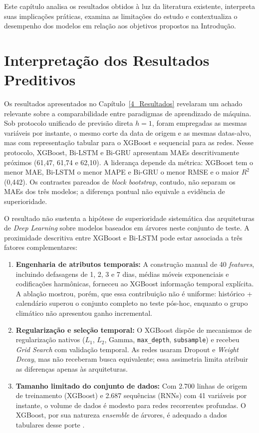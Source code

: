 Este capítulo analisa os resultados obtidos à luz da literatura existente, interpreta suas implicações práticas, examina as limitações do estudo e contextualiza o desempenho dos modelos em relação aos objetivos propostos na Introdução.

\section{Interpretação dos Resultados Preditivos}

Os resultados apresentados no Capítulo~\ref{4_Resultados} revelaram um achado relevante sobre a comparabilidade entre paradigmas de aprendizado de máquina. Sob protocolo unificado de previsão direta $h=1$, foram empregadas as mesmas variáveis por instante, o mesmo corte da data de origem e as mesmas datas-alvo, mas com representação tabular para o XGBoost e sequencial para as redes. Nesse protocolo, XGBoost, Bi-LSTM e Bi-GRU apresentam MAEs descritivamente próximos (61,47, 61,74 e 62,10). A liderança depende da métrica: XGBoost tem o menor MAE, Bi-LSTM o menor MAPE e Bi-GRU o menor RMSE e o maior $R^2$ (0,442). Os contrastes pareados de \textit{block bootstrap}, contudo, não separam os MAEs dos três modelos; a diferença pontual não equivale a evidência de superioridade.

O resultado não sustenta a hipótese de superioridade sistemática das arquiteturas de \textit{Deep Learning} sobre modelos baseados em árvores neste conjunto de teste. A proximidade descritiva entre XGBoost e Bi-LSTM pode estar associada a três fatores complementares:

\begin{enumerate}
    \item \textbf{Engenharia de atributos temporais:} A construção manual de 40 \textit{features}, incluindo defasagens de 1, 2, 3 e 7 dias, médias móveis exponenciais e codificações harmônicas, forneceu ao XGBoost informação temporal explícita. A ablação mostrou, porém, que essa contribuição não é uniforme: histórico + calendário superou o conjunto completo no teste pós-hoc, enquanto o grupo climático não apresentou ganho incremental.

    \item \textbf{Regularização e seleção temporal:} O XGBoost dispõe de mecanismos de regularização nativos ($L_1$, $L_2$, Gamma, \texttt{max\_depth}, \texttt{subsample}) e recebeu \textit{Grid Search} com validação temporal. As redes usaram Dropout e \textit{Weight Decay}, mas não receberam busca equivalente; essa assimetria limita atribuir as diferenças apenas às arquiteturas.

    \item \textbf{Tamanho limitado do conjunto de dados:} Com 2.700 linhas de origem de treinamento (XGBoost) e 2.687 sequências (RNNs) com 41 variáveis por instante, o volume de dados é modesto para redes recorrentes profundas. O XGBoost, por sua natureza \textit{ensemble} de árvores, é adequado a dados tabulares desse porte \cite{chen2016xgboost}.
\end{enumerate}


